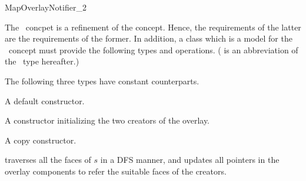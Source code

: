 
\ccRefPageBegin


\begin{ccRefConcept}{MapOverlayNotifier_2}


\ccDefinition
The \ccRefName\ concpet is a refinement of the 
 concept. 
Hence, the requirements of the latter are the requirements of the former.
In addition, a class which is a model for the \ccRefName\ concept 
must provide the following types and operations. 
( is an abbreviation of the \ccRefName\ type hereafter.)

\ccTypes
{}



The following three types have constant counterparts.





\ccCreation
{}
{A default constructor.}

{A constructor initializing the two creators of the overlay.}

{A copy constructor.}

\ccOperations
{}
{traverses all the faces of $s$ in a DFS manner, 
and updates all pointers in the overlay components to refer 
the suitable faces of the creators.}


\end{ccRefConcept}
